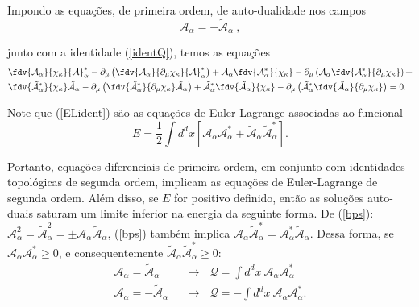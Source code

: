 Impondo as equações, de primeira ordem, de auto-dualidade nos campos
\begin{equation}
    \mathcal{A}_\alpha = \pm\tilde{\mathcal{A}}_\alpha \ ,  
    \label{bps}
\end{equation}

junto com a identidade (\ref{identQ}), temos as equações
\begin{equation}
\begin{split}
    &\fdv{\mathcal{A}_\alpha}{\chi_\kappa}{\mathcal{A}}_\alpha^* - \partial_\mu \left(\fdv{\mathcal{A}_\alpha}{\partial_\mu\chi_\kappa}{\mathcal{A}}_\alpha^* \right) + \mathcal{A}_\alpha\fdv{{\mathcal{A}}_\alpha^*}{\chi_\kappa} - \partial_\mu \left( \mathcal{A}_\alpha\fdv{{\mathcal{A}}_\alpha^*}{\partial_\mu\chi_\kappa} \right) +\\
    & \fdv{\tilde{\mathcal{A}}_\alpha^*}{\chi_\kappa}\tilde{\mathcal{A}}_\alpha - \partial_\mu \left(\fdv{\tilde{\mathcal{A}}_\alpha^*}{\partial_\mu\chi_\kappa}\tilde{\mathcal{A}}_\alpha \right) + \tilde{\mathcal{A}}_\alpha^*\fdv{\tilde{\mathcal{A}}_\alpha}{\chi_\kappa} - \partial_\mu \left( \tilde{\mathcal{A}}_\alpha^*\fdv{\tilde{\mathcal{A}}_\alpha}{\partial_\mu\chi_\kappa} \right) = 0.
\end{split}
\label{ELident}
\end{equation}

Note que (\ref{ELident}) são as equações de Euler-Lagrange associadas ao funcional
\begin{equation}
    E = \dfrac{1}{2}\int d^d x \left[\mathcal{A}_\alpha \mathcal{A}_\alpha^* + \tilde{\mathcal{A}}_\alpha \tilde{\mathcal{A}}_\alpha^* \right].
    \label{energia}
\end{equation}

Portanto, equações diferenciais de primeira ordem, em conjunto com identidades topológicas de segunda ordem, implicam as equações de Euler-Lagrange de segunda ordem. Além disso, se $E$ for positivo definido, então as soluções auto-duais saturam um limite inferior na energia da seguinte forma. De (\ref{bps}): $\mathcal{A}^2_\alpha = \tilde{\mathcal{A}}^2_\alpha = \pm\mathcal{A}_\alpha\tilde{\mathcal{A}}_\alpha$, (\ref{bps}) também implica $\mathcal{A}_\alpha\tilde{\mathcal{A}}_\alpha^* = \mathcal{A}^*_\alpha\tilde{\mathcal{A}}_\alpha$. Dessa forma, se $\mathcal{A}_\alpha\mathcal{A}^*_\alpha \geq 0$, e consequentemente $\tilde{\mathcal{A}}_\alpha\tilde{\mathcal{A}}^{*}_{\alpha} \geq 0$:
\begin{equation}
\begin{split}
    \mathcal{A}_\alpha = \tilde{\mathcal{A}}_\alpha \ \ \ &\rightarrow \ \ \ \mathcal{Q} = \int d^d x  \ \mathcal{A}_\alpha\mathcal{A}_\alpha^*\\
    \mathcal{A}_\alpha = -\tilde{\mathcal{A}}_\alpha \ \ \ &\rightarrow \ \ \ \mathcal{Q} = -\int d^dx \ \mathcal{A}_\alpha\mathcal{A}^*_\alpha.
\end{split}
\end{equation}


